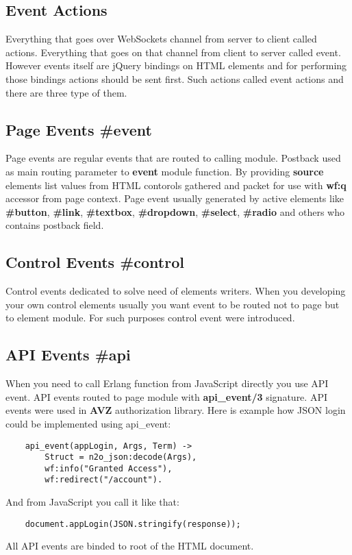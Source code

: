 \newpage
\subsection*{Event Actions}
Everything that goes over WebSockets channel from server to client called actions.
Everything that goes on that channel from client to server called event. However
events itself are jQuery bindings on HTML elements and for performing those bindings
actions should be sent first. Such actions called event actions and there are three type
of them.

\subsection{Page Events \#event}
Page events are regular events that are routed to calling module. Postback used as main
routing parameter to {\bf event} module function. By providing {\bf source} elements list
values from HTML contorols gathered and packet for use with {\bf wf:q} accessor from page context.
Page event usually generated by active elements like {\bf \#button}, {\bf \#link},
{\bf \#textbox}, {\bf \#dropdown}, {\bf \#select}, {\bf \#radio} and others who contains postback field.

\subsection{Control Events \#control}
Control events dedicated to solve need of elements writers. When you developing your
own control elements usually you want event to be routed not to page but to element module.
For such purposes control event were introduced.

\subsection{API Events \#api}
When you need to call Erlang function from JavaScript directly you use API event.
API events routed to page module with {\bf api\_event/3} signature. API events were
used in {\bf AVZ} authorization library. Here is example how JSON login could be
implemented using api\_event:

\vspace{1\baselineskip}
\begin{lstlisting}
    api_event(appLogin, Args, Term) ->
        Struct = n2o_json:decode(Args),
        wf:info("Granted Access"),
        wf:redirect("/account").
\end{lstlisting}
\vspace{1\baselineskip}
And from JavaScript you call it like that:
\vspace{1\baselineskip}
\begin{lstlisting}
    document.appLogin(JSON.stringify(response));
\end{lstlisting}
\vspace{1\baselineskip}
All API events are binded to root of the HTML document.


